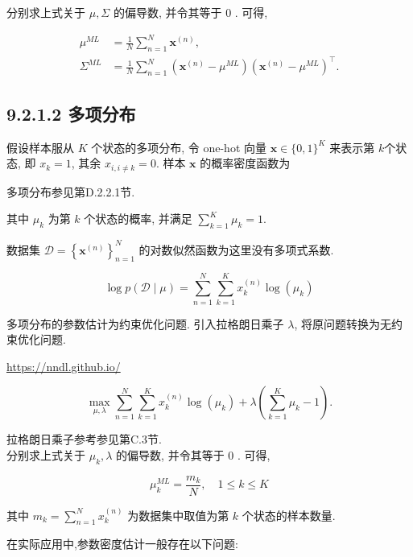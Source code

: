 \documentclass[10pt]{article}
\begin{document}
分别求上式关于 $\mu, \Sigma$ 的偏导数, 并令其等于 0 . 可得,


\begin{align*}
\mu^{M L} & =\frac{1}{N} \sum_{n=1}^{N} \boldsymbol{x}^{(n)},  \tag{9.31}\\
\Sigma^{M L} & =\frac{1}{N} \sum_{n=1}^{N}\left(\boldsymbol{x}^{(n)}-\mu^{M L}\right)\left(\boldsymbol{x}^{(n)}-\mu^{M L}\right)^{\top} . \tag{9.32}
\end{align*}


\subsection*{9.2.1.2 多项分布}
假设样本服从 $K$ 个状态的多项分布, 令 one-hot 向量 $\boldsymbol{x} \in\{0,1\}^{K}$ 来表示第 $k$个状态, 即 $x_{k}=1$, 其余 $x_{i, i \neq k}=0$. 样本 $\boldsymbol{x}$ 的概率密度函数为

多项分布参见第D.2.2.1节.

其中 $\mu_{k}$ 为第 $k$ 个状态的概率, 并满足 $\sum_{k=1}^{K} \mu_{k}=1$.

数据集 $\mathcal{D}=\left\{\boldsymbol{x}^{(n)}\right\}_{n=1}^{N}$ 的对数似然函数为这里没有多项式系数.


\begin{equation*}
\log p(\mathcal{D} \mid \mu)=\sum_{n=1}^{N} \sum_{k=1}^{K} x_{k}^{(n)} \log \left(\mu_{k}\right) \tag{9.34}
\end{equation*}


多项分布的参数估计为约束优化问题. 引入拉格朗日乘子 $\lambda$, 将原问题转换为无约束优化问题.

\href{https://nndl.github.io/}{https://nndl.github.io/}


\begin{equation*}
\max _{\mu, \lambda} \sum_{n=1}^{N} \sum_{k=1}^{K} x_{k}^{(n)} \log \left(\mu_{k}\right)+\lambda\left(\sum_{k=1}^{K} \mu_{k}-1\right) . \tag{9.35}
\end{equation*}


拉格朗日乘子参考参见第C.3节.\\
分别求上式关于 $\mu_{k}, \lambda$ 的偏导数, 并令其等于 0 . 可得,


\begin{equation*}
\mu_{k}^{M L}=\frac{m_{k}}{N}, \quad 1 \leq k \leq K \tag{9.36}
\end{equation*}


其中 $m_{k}=\sum_{n=1}^{N} x_{k}^{(n)}$ 为数据集中取值为第 $k$ 个状态的样本数量.

在实际应用中,参数密度估计一般存在以下问题:
\end{document}
